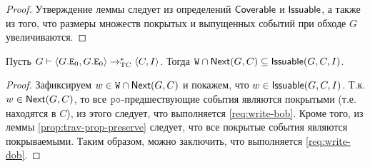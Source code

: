 \begin{proof}
  Утверждение леммы следует из определений ${\sf Coverable}$ и ${\sf Issuable}$, а также из того, что размеры множеств покрытых и выпущенных событий при обходе $G$ увеличиваются.
\end{proof}
\begin{lemma}
  \label{prop:next-write}
  Пусть $G \vdash {\langle{G.{\mathtt{E}}_0, G.{\mathtt{E}}_0}\rangle} \rightarrow_{\rm TC}^{*} {\langle{C, I}\rangle}$.
  Тогда ${\mathtt{W}} \cap {\sf Next}(G, C) \subseteq {\sf Issuable}(G,C,I)$.
\end{lemma}
\begin{proof}
  Зафиксируем $w \in {\mathtt{W}} \cap {\sf Next}(G, C)$ и покажем, что $w \in {\sf Issuable}(G, C, I)$.
  Т.к. $w \in {\sf Next}(G, C)$, то все $\lPO$-предшествующие события являются покрытыми (т.е.
  находятся в $C$), из этого следует, что выполняется \ref{req:write-bob}. Кроме того, из леммы
  \ref{prop:trav-prop-preserve} следует, что все покрытые события являются покрываемыми. Таким образом, можно заключить, что выполняется 
  \ref{req:write-dob}.
\end{proof}
